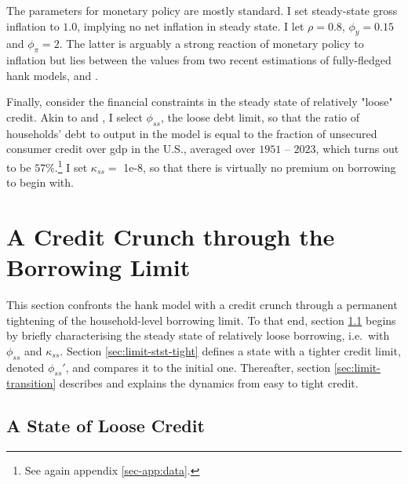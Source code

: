 \documentclass[a4paper,12pt]{article} %
\numberwithin{equation}{section} %
\numberwithin{figure}{section}
\numberwithin{table}{section}
\begin{document}
The parameters for monetary policy are mostly standard. I set steady-state gross inflation to $1.0$, implying no net inflation in steady state. I let $\rho = 0.8$, $\phi_y = 0.15$ and $\phi_{\pi} = 2$. The latter is arguably a strong reaction of monetary policy to inflation but lies between the values from two recent estimations of fully-fledged \Gls{hank} models, \textcite{boehl2022} and \textcite{bayer2023}.

Finally, consider the financial constraints in the steady state of relatively "loose" credit. Akin to \textcite{gl2017} and \textcite{bayer2023}, I select $\phi_{ss}$, the loose debt limit, so that the ratio of households' debt to output in the model is equal to the fraction of unsecured consumer credit over \Gls{gdp} in the U.S., averaged over $1951$ -- $2023$, which turns out to be $57\%$.\footnote{See again appendix \ref{sec-app:data}.} I set $\kappa_{ss} =$ 1e-8, so that there is virtually no premium on borrowing to begin with. %

\section{A Credit Crunch through the Borrowing Limit}
\label{sec:limit}

This section confronts the \Gls{hank} model with a credit crunch through a permanent tightening of the household-level borrowing limit. To that end, section \ref{sec:limit-stst-loose} begins by briefly characterising the steady state of relatively loose borrowing, i.e.~with $\phi_{ss}$ and $\kappa_{ss}$. Section \ref{sec:limit-stst-tight} defines a state with a tighter credit limit, denoted $\phi_{ss}'$, and compares it to the initial one. Thereafter, section \ref{sec:limit-transition} describes and explains the dynamics from easy to tight credit.

\subsection{A State of Loose Credit}
\label{sec:limit-stst-loose}
\end{document}
